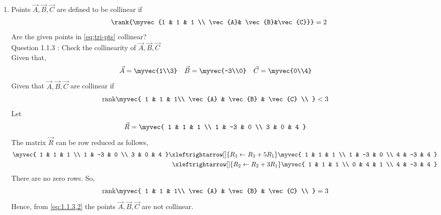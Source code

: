 \documentclass[11pt]{book}
\begin{document}
\begin{enumerate}[label=\thesection.\arabic*.,ref=\thesection.\theenumi]
\item   Points $\vec{A}, \vec{B}, \vec{C}$ are defined to be collinear if 
		\begin{align}
			\rank{\myvec{1 & 1 & 1 \\ \vec{A}& \vec{B}&\vec{C}}} = 2
		\end{align}
Are the given points in
			\eqref{eq:tri-pts}
collinear?\\
Question 1.1.3 : Check the collinearity of $\vec{A},\vec{B},\vec{C}$ \\ 
\solution 
Given that,
\begin{align}
    \vec{A} = \myvec{1\\3}
    \quad
    \vec{B} &= \myvec{-3\\0}
    \quad
    \vec{C} = \myvec{0\\4}
\end{align}
Given that $\vec{A},\vec{B},\vec{C}$ are collinear if
\begin{align}
    \text{rank}\myvec{
    1 & 1 & 1\\
    \vec{A} & \vec{B} & \vec{C} \\
    } &< 3 
    \label{eq:1.1.3,2}
\end{align} 
Let
\begin{align}
    \vec{R}&=\myvec{
    1 & 1 & 1
    \\
    1 & -3 & 0
    \\
    3 & 0 & 4
    } 
\end{align} 
The matrix $\vec{R}$ can be row reduced as follows,
\begin{align}
    \label{eq:matthrowoperations}
    \myvec{
    1 & 1 & 1
    \\
    1 & -3 & 0
    \\
    3 & 0 & 4
    }
     \xleftrightarrow[]{R_3 \leftarrow R_3+5R_1}
    \myvec{
    1 & 1 & 1
    \\
    1 & -3 & 0
    \\
    4 & -3 & 4 
    }
    \\
     \xleftrightarrow[]{R_2\leftarrow R_2+3R_1}
    \myvec{
    1 & 1 & 1
    \\
    0 & 4 & 1
    \\
    4 & -3 & 4 
    }
\end{align}
There are no zero rows. So,
\begin{align}
    \text{rank}\myvec{
    1 & 1 & 1\\
    \vec{A} & \vec{B} & \vec{C} \\
    } &= 3 
\end{align}  
Hence, from \eqref{eq:1.1.3,2} the points $\vec{A},\vec{B},\vec{C}$ are not collinear. 


\end{enumerate}
\end{document}
